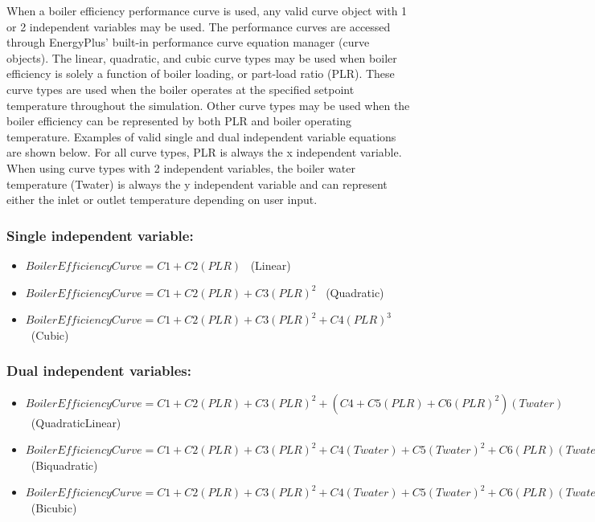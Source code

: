 When a boiler efficiency performance curve is used, any valid curve object with 1 or 2 independent variables may be used. The performance curves are accessed through EnergyPlus' built-in performance curve equation manager (curve objects). The linear, quadratic, and cubic curve types may be used when boiler efficiency is solely a function of boiler loading, or part-load ratio (PLR). These curve types are used when the boiler operates at the specified setpoint temperature throughout the simulation. Other curve types may be used when the boiler efficiency can be represented by both PLR and boiler operating temperature. Examples of valid single and dual independent variable equations are shown below. For all curve types, PLR is always the x independent variable. When using curve types with 2 independent variables, the boiler water temperature (Twater) is always the y independent variable and can represent either the inlet or outlet temperature depending on user input.

\subsubsection{Single independent variable:}\label{single-independent-variable}

\begin{itemize}
\item
  \(BoilerEfficiencyCurve = C1 + C2\left( {PLR} \right)\) ~(Linear)
\item
  \(BoilerEfficiencyCurve = C1 + C2\left( {PLR} \right) + C3{\left( {PLR} \right)^2}\) ~(Quadratic)
\item
  \(BoilerEfficiencyCurve = C1 + C2\left( {PLR} \right) + C3{\left( {PLR} \right)^2} + C4{(PLR)^3}\) ~(Cubic)
\end{itemize}

\subsubsection{Dual independent variables:}\label{dual-independent-variables}

\begin{itemize}
\item
  \(BoilerEfficiencyCurve = C1 + C2\left( {PLR} \right) + C3{\left( {PLR} \right)^2} + \left( {C4 + C5\left( {PLR} \right) + C6{{\left( {PLR} \right)}^2}} \right)\left( {Twater} \right)\) ~(QuadraticLinear)
\item
  \(BoilerEfficiencyCurve = C1 + C2\left( {PLR} \right) + C3{\left( {PLR} \right)^2} + C4\left( {Twater} \right) + C5{(Twater)^2} + C6(PLR)(Twater)\) ~(Biquadratic)
\item
  \(BoilerEfficiencyCurve = C1 + C2\left( {PLR} \right) + C3{\left( {PLR} \right)^2} + C4\left( {Twater} \right) + C5{(Twater)^2} + C6\left( {PLR} \right)\left( {Twater} \right) + C7{(PLR)^3} + C8{(Twater)^3} + C9{\left( {PLR} \right)^2}\left( {Twater} \right) + C10\left( {PLR} \right){(Twater)^2}\) ~(Bicubic)
\end{itemize}

